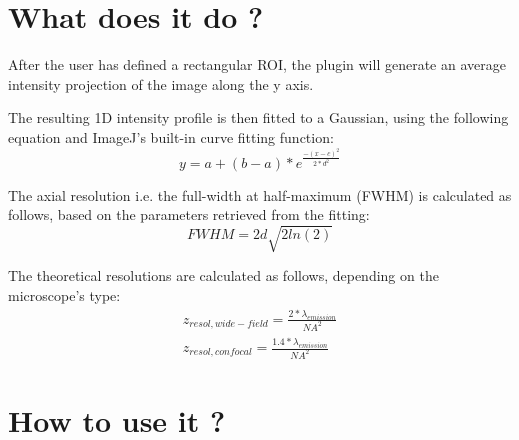 \documentclass[a4paper, 11pt]{report}%
\begin{document}
\section{What does it do ?}
\label{sec:garr-what}

\begin{enumerate*}
	\item After the user has defined a rectangular ROI, the plugin will generate an average intensity projection of the image along the y axis.
	\item The resulting 1D intensity profile is then fitted to a Gaussian, using the following equation and ImageJ's built-in curve fitting function:
		\begin{equation}
			y = a + (b-a)*e^{\frac{-(x-c)^{2}}{2*d^{2}}}
			\label{eqn:garr-gaussian}
		\end{equation}
	\item The axial resolution i.e. the full-width at half-maximum (FWHM) is calculated as follows, based on the parameters retrieved from the fitting:
	\begin{equation}
		FWHM=2d\sqrt{2ln(2)}
		\label{eqn:garr-FWHM}
	\end{equation}
	\item The theoretical resolutions are calculated as follows, depending on the microscope's type:
		\begin{eqnarray}
			z_{resol, wide-field}=\frac{2*\lambda_{emission}}{NA^2}
			\label{eqn:garr-zWF}\\
			z_{resol, confocal}=\frac{1.4*\lambda_{emission}}{NA^2}
			\label{eqn:garr-zConf}
		\end{eqnarray}
\end{enumerate*}

\section{How to use it ?}
\label{sec:garr-how}
\end{document}
